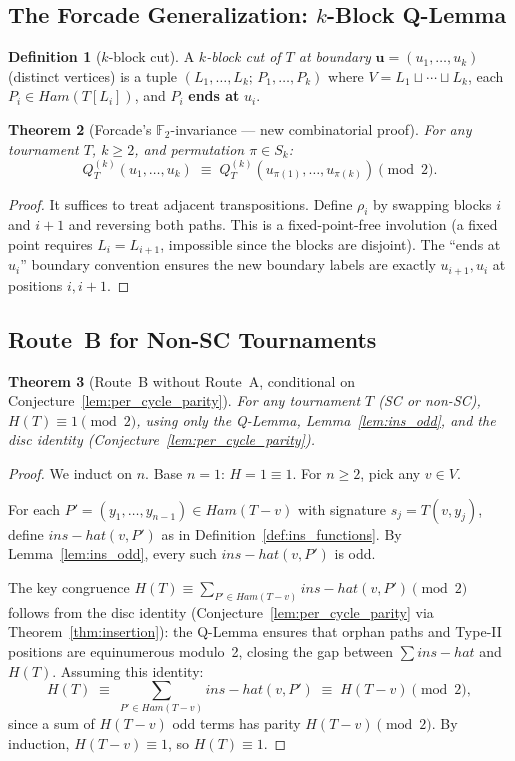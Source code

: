 \documentclass[12pt,reqno]{amsart}
\theoremstyle{plain}
\newtheorem{theorem}{Theorem}[section]
\theoremstyle{definition}
\newtheorem{definition}[theorem]{Definition}
\theoremstyle{remark}
\newcommand{\Ham}{\mathrm{Ham}}
\newcommand{\inshat}{\widehat{\mathrm{ins}}}
\renewcommand{\Ham}{Ham}%
\renewcommand{\inshat}{ins-hat}%
\begin{document}
\subsection{The Forcade Generalization: $k$-Block Q-Lemma}
\label{subsec:forcade_k}

\begin{definition}[$k$-block cut]\label{def:kblock_cut}
A \emph{$k$-block cut of $T$ at boundary} $\mathbf{u}=(u_1,\ldots,u_k)$
(distinct vertices) is a tuple $(L_1,\ldots,L_k;\,P_1,\ldots,P_k)$ where
$V=L_1\sqcup\cdots\sqcup L_k$, each $P_i\in\Ham(T[L_i])$, and $P_i$
\textbf{ends at} $u_i$.
\end{definition}

\begin{theorem}[Forcade's $\mathbb{F}_2$-invariance --- new combinatorial proof]
\label{thm:forcade_new}
For any tournament $T$, $k\ge2$, and permutation $\pi\in S_k$:
\[
  Q^{(k)}_T(u_1,\ldots,u_k)\;\equiv\;
  Q^{(k)}_T(u_{\pi(1)},\ldots,u_{\pi(k)})\pmod{2}.
\]
\end{theorem}
\begin{proof}
It suffices to treat adjacent transpositions. Define $\rho_i$ by swapping blocks
$i$ and $i+1$ and reversing both paths. This is a fixed-point-free involution
(a fixed point requires $L_i = L_{i+1}$, impossible since the blocks are
disjoint). The ``ends at $u_i$'' boundary convention ensures the new boundary
labels are exactly $u_{i+1}, u_i$ at positions $i, i+1$.
\end{proof}

\subsection{Route~B for Non-SC Tournaments}

\begin{theorem}[Route~B without Route~A, conditional on Conjecture~\ref{lem:per_cycle_parity}]\label{thm:routeB_standalone}
For any tournament $T$ (SC or non-SC), $H(T)\equiv1\pmod2$, using only
the Q-Lemma, Lemma~\ref{lem:ins_odd}, and the disc identity
(Conjecture~\ref{lem:per_cycle_parity}).
\end{theorem}
\begin{proof}
We induct on $n$. Base $n=1$: $H=1\equiv 1$. For $n\ge2$, pick any $v\in V$.

For each $P' = (y_1,\ldots,y_{n-1})\in\Ham(T{-}v)$ with signature $s_j = T(v,y_j)$,
define $\inshat(v,P')$ as in Definition~\ref{def:ins_functions}.
By Lemma~\ref{lem:ins_odd}, every such $\inshat(v,P')$ is odd.

The key congruence $H(T) \equiv \sum_{P'\in\Ham(T{-}v)}\inshat(v,P') \pmod{2}$
follows from the disc identity (Conjecture~\ref{lem:per_cycle_parity} via
Theorem~\ref{thm:insertion}): the Q-Lemma ensures that orphan paths and
Type-II positions are equinumerous modulo~2, closing the gap between
$\sum \inshat$ and $H(T)$. Assuming this identity:
\[
  H(T)\;\equiv\; \sum_{P'\in\Ham(T{-}v)}\inshat(v,P') \;\equiv\; H(T{-}v)\pmod2,
\]
since a sum of $H(T{-}v)$ odd terms has parity $H(T{-}v)\pmod2$.
By induction, $H(T{-}v)\equiv1$, so $H(T)\equiv1$. \qedhere
\end{proof}
\end{document}
